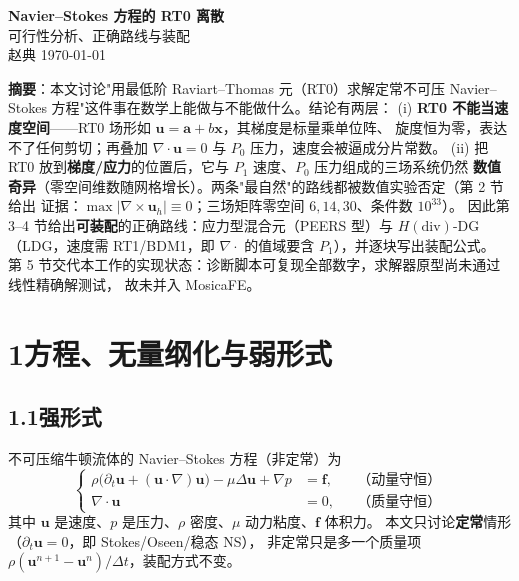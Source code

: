 \documentclass[UTF8,11pt,a4paper]{ctexart}
\theoremstyle{wjplain}
\theoremstyle{wjdef}
\newcommand{\bu}{\boldsymbol u}
\newcommand{\bx}{\boldsymbol x}
\newcommand{\grad}{\nabla}
\newcommand{\dive}{\nabla\cdot}
\newcommand{\curl}{\nabla\times}
\begin{document}
\begin{center}
{\LARGE\bfseries Navier--Stokes 方程的 RT0 离散}\\[6pt]
{\large 可行性分析、正确路线与装配}\\[10pt]
{\normalsize 赵典 \quad \today}
\end{center}

\vspace{0.3em}
\begin{center}
\begin{minipage}{0.94\textwidth}
\small\raggedright
\textbf{摘要}：本文讨论"用最低阶 Raviart--Thomas 元（RT0）求解定常不可压
Navier--Stokes 方程"这件事在数学上能做与不能做什么。结论有两层：
(i) \textbf{RT0 不能当速度空间}——RT0 场形如 $\bu=\boldsymbol a+b\bx$，其梯度是标量乘单位阵、
旋度恒为零，表达不了任何剪切；再叠加 $\dive\bu=0$ 与 $P_0$ 压力，速度会被逼成分片常数。
(ii) 把 RT0 放到\textbf{梯度/应力}的位置后，它与 $P_1$ 速度、$P_0$ 压力组成的三场系统仍然
\textbf{数值奇异}（零空间维数随网格增长）。两条"最自然"的路线都被数值实验否定（第 2 节给出
证据：$\max\lvert\curl\bu_h\rvert\equiv0$；三场矩阵零空间 $6,14,30$、条件数 $10^{33}$）。
因此第 3--4 节给出\textbf{可装配}的正确路线：应力型混合元（PEERS 型）与 $H(\mathrm{div})$-DG
（LDG，速度需 RT1/BDM1，即 $\dive$ 的值域要含 $P_1$），并逐块写出装配公式。
第 5 节交代本工作的实现状态：诊断脚本可复现全部数字，求解器原型尚未通过线性精确解测试，
故未并入 MosicaFE。
\end{minipage}
\end{center}

\vspace{0.4em}
{\small\tableofcontents}

\section{\texorpdfstring{1\quad 方程、无量纲化与弱形式}{1 方程、无量纲化与弱形式}}

\subsection*{1.1\quad 强形式}

不可压缩牛顿流体的 Navier--Stokes 方程（非定常）为
\begin{equation}\tag{1.1}\label{eq:ns}
  \left\{
  \begin{aligned}
    \rho\bigl(\partial_t\bu+(\bu\cdot\grad)\bu\bigr)-\mu\Delta\bu+\grad p&=\boldsymbol f,
    &&\text{（动量守恒）}\\
    \dive\bu&=0, &&\text{（质量守恒）}
  \end{aligned}
  \right.
\end{equation}
其中 $\bu$ 是速度、$p$ 是压力、$\rho$ 密度、$\mu$ 动力粘度、$\boldsymbol f$ 体积力。
本文只讨论\textbf{定常}情形（$\partial_t\bu=0$，即 Stokes/Oseen/稳态 NS），
非定常只是多一个质量项 $\rho(\bu^{n+1}-\bu^n)/\Delta t$，装配方式不变。
\end{document}
